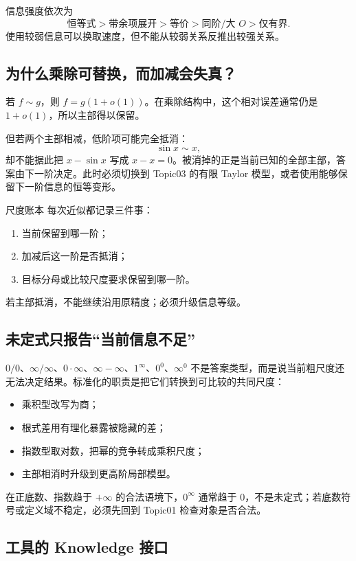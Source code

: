 \documentclass[11pt,a4paper]{ctexart}
\begin{document}
信息强度依次为
\[
\text{恒等式} > \text{带余项展开} > \text{等价} > \text{同阶/大 }O > \text{仅有界}.
\]
使用较弱信息可以换取速度，但不能从较弱关系反推出较强关系。

\subsection{为什么乘除可替换，而加减会失真？}

若 $f\sim g$，则 $f=g(1+o(1))$。在乘除结构中，这个相对误差通常仍是 $1+o(1)$，所以主部得以保留。

但若两个主部相减，低阶项可能完全抵消：
\[
\sin x\sim x,
\]
却不能据此把 $x-\sin x$ 写成 $x-x=0$。被消掉的正是当前已知的全部主部，答案由下一阶决定。此时必须切换到 Topic03 的有限 Taylor 模型，或者使用能够保留下一阶信息的恒等变形。

\begin{methodbox}{尺度账本}
每次近似都记录三件事：
\begin{enumerate}
  \item 当前保留到哪一阶；
  \item 加减后这一阶是否抵消；
  \item 目标分母或比较尺度要求保留到哪一阶。
\end{enumerate}
若主部抵消，不能继续沿用原精度；必须升级信息等级。
\end{methodbox}

\subsection{未定式只报告“当前信息不足”}

$0/0$、$\infty/\infty$、$0\cdot\infty$、$\infty-\infty$、$1^\infty$、$0^0$、$\infty^0$ 不是答案类型，而是说当前粗尺度还无法决定结果。标准化的职责是把它们转换到可比较的共同尺度：
\begin{itemize}
  \item 乘积型改写为商；
  \item 根式差用有理化暴露被隐藏的差；
  \item 指数型取对数，把幂的竞争转成乘积尺度；
  \item 主部相消时升级到更高阶局部模型。
\end{itemize}

在正底数、指数趋于 $+\infty$ 的合法语境下，$0^\infty$ 通常趋于 $0$，不是未定式；若底数符号或定义域不稳定，必须先回到 Topic01 检查对象是否合法。

\subsection{工具的 Knowledge 接口}
\end{document}
